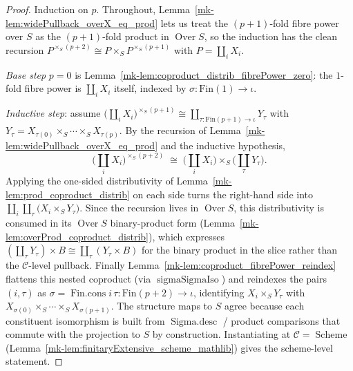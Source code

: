 \begin{proof}
  Induction on \(p\). Throughout, Lemma~\ref{mk-lem:widePullback_overX_eq_prod} lets us treat the
  \((p+1)\)-fold fibre power over \(S\) as the \((p+1)\)-fold product in \(\operatorname{Over} S\),
  so the induction has the clean recursion \(P^{\times_S (p+2)} \cong P \times_S P^{\times_S (p+1)}\)
  with \(P = \coprod_i X_i\).

  \emph{Base step} \(p = 0\) is Lemma~\ref{mk-lem:coproduct_distrib_fibrePower_zero}: the \(1\)-fold
  fibre power is \(\coprod_i X_i\) itself, indexed by \(\sigma : \mathrm{Fin}(1) \to \iota\).

  \emph{Inductive step}: assume \(\bigl(\coprod_i X_i\bigr)^{\times_S (p+1)} \cong \coprod_{\tau :
  \mathrm{Fin}(p+1) \to \iota} Y_\tau\) with \(Y_\tau = X_{\tau(0)} \times_S \cdots \times_S
  X_{\tau(p)}\). By the recursion of Lemma~\ref{mk-lem:widePullback_overX_eq_prod} and the inductive
  hypothesis,
  \[
    \bigl(\textstyle\coprod_i X_i\bigr)^{\times_S (p+2)}
      \;\cong\;
    \bigl(\textstyle\coprod_i X_i\bigr) \times_S \bigl(\textstyle\coprod_\tau Y_\tau\bigr).
  \]
  Applying the one-sided distributivity of
  Lemma~\ref{mk-lem:prod_coproduct_distrib} on each side turns the right-hand side into
  \(\coprod_{i}\coprod_{\tau} \bigl(X_i \times_S Y_\tau\bigr)\). Since the recursion lives in
  \(\operatorname{Over} S\), this distributivity is consumed in its \(\operatorname{Over} S\)
  binary-product form (Lemma~\ref{mk-lem:overProd_coproduct_distrib}), which expresses
  \((\coprod_\tau Y_\tau) \times B \cong \coprod_\tau (Y_\tau \times B)\) for the binary product in the
  slice rather than the \(\mathcal{C}\)-level pullback. Finally
  Lemma~\ref{mk-lem:coproduct_fibrePower_reindex} flattens this nested coproduct
  (via \(\operatorname{sigmaSigmaIso}\)) and reindexes the pairs \((i,\tau)\) as
  \(\sigma = \operatorname{Fin.cons} i\,\tau : \mathrm{Fin}(p+2) \to \iota\), identifying \(X_i
  \times_S Y_\tau\) with \(X_{\sigma(0)} \times_S \cdots \times_S X_{\sigma(p+1)}\). The structure
  maps to \(S\) agree because each constituent isomorphism is built from \(\operatorname{Sigma.desc}\)
  / product comparisons that commute with the projection to \(S\) by construction. Instantiating at
  \(\mathcal{C} = \operatorname{Scheme}\) (Lemma~\ref{mk-lem:finitaryExtensive_scheme_mathlib}) gives the
  scheme-level statement.
\end{proof}

